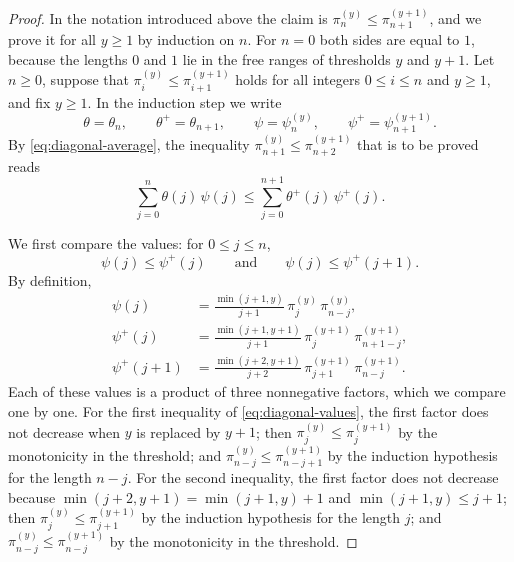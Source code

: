 \documentclass{amsart}
\theoremstyle{definition}
\theoremstyle{remark}
\numberwithin{equation}{section}
\begin{document}
\begin{proof}
In the notation introduced above the claim is
$\pi^{(y)}_n\le\pi^{(y+1)}_{n+1}$, and we prove it for all $y\ge1$ by
induction on $n$. For $n=0$ both sides are equal to $1$, because the lengths
$0$ and $1$ lie in the free ranges of thresholds $y$ and $y+1$. Let
$n\ge0$, suppose that $\pi^{(y)}_i\le\pi^{(y+1)}_{i+1}$ holds for all
integers $0\le i\le n$ and $y\ge1$, and fix $y\ge1$. In the induction step we
write
\[
\theta=\theta_n,\qquad\theta^{+}=\theta_{n+1},\qquad
\psi=\psi^{(y)}_n,\qquad\psi^{+}=\psi^{(y+1)}_{n+1}.
\]
By \eqref{eq:diagonal-average}, the inequality
$\pi^{(y)}_{n+1}\le\pi^{(y+1)}_{n+2}$ that is to be proved reads
\begin{equation}\label{eq:diagonal-goal}
\sum_{j=0}^{n}\theta(j)\,\psi(j)\le\sum_{j=0}^{n+1}\theta^{+}(j)\,\psi^{+}(j).
\end{equation}

We first compare the values: for $0\le j\le n$,
\begin{equation}\label{eq:diagonal-values}
\psi(j)\le\psi^{+}(j)\qquad\text{and}\qquad\psi(j)\le\psi^{+}(j+1).
\end{equation}
By definition,
\begin{align*}
\psi(j)&=\frac{\min(j+1,y)}{j+1}\,\pi^{(y)}_j\,\pi^{(y)}_{n-j},\\
\psi^{+}(j)&=\frac{\min(j+1,y+1)}{j+1}\,\pi^{(y+1)}_j\,\pi^{(y+1)}_{n+1-j},\\
\psi^{+}(j+1)&=\frac{\min(j+2,y+1)}{j+2}\,\pi^{(y+1)}_{j+1}\,\pi^{(y+1)}_{n-j}.
\end{align*}
Each of these values is a product of three nonnegative factors, which we
compare one by one. For the first inequality of
\eqref{eq:diagonal-values}, the first factor does not decrease when $y$ is
replaced by $y+1$; then $\pi^{(y)}_j\le\pi^{(y+1)}_j$ by the monotonicity in
the threshold; and $\pi^{(y)}_{n-j}\le\pi^{(y+1)}_{n-j+1}$ by the induction
hypothesis for the length $n-j$. For the second inequality, the first factor
does not decrease because $\min(j+2,y+1)=\min(j+1,y)+1$ and
$\min(j+1,y)\le j+1$; then $\pi^{(y)}_j\le\pi^{(y+1)}_{j+1}$ by the induction
hypothesis for the length $j$; and $\pi^{(y)}_{n-j}\le\pi^{(y+1)}_{n-j}$ by
the monotonicity in the threshold.


\end{proof}
\end{document}
